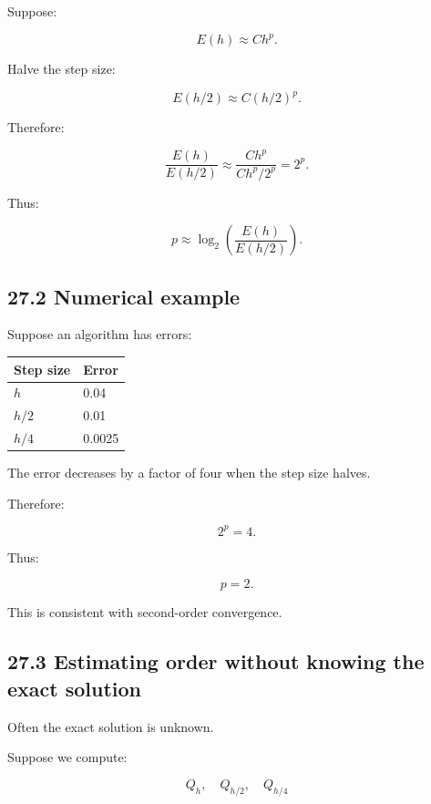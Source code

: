 Suppose:

\[ E(h)\approx Ch^p. \]

Halve the step size:

\[ E(h/2)\approx C(h/2)^p. \]

Therefore:

\[ \frac{E(h)}{E(h/2)} \approx \frac{Ch^p}{Ch^p/2^p} =2^p. \]

Thus:

\[ \boxed{ p\approx \log_2\left( \frac{E(h)}{E(h/2)} \right) }. \]

\subsection{27.2 Numerical example}\label{02-foundations-ii-ch029-numerical-example}

\hypertarget{02-foundations-ii-ch029-numerical-example}{}

Suppose an algorithm has errors:

{\def\LTcaptype{none} %
\begin{longtable}[]{@{}ll@{}}
\toprule\noalign{}
Step size & Error \\
\midrule\noalign{}
\endhead
\bottomrule\noalign{}
\endlastfoot
\(h\) & 0.04 \\
\(h/2\) & 0.01 \\
\(h/4\) & 0.0025 \\
\end{longtable}
}

The error decreases by a factor of four when the step size halves.

Therefore:

\[ 2^p=4. \]

Thus:

\[ \boxed{p=2}. \]

This is consistent with second-order convergence.

\subsection{27.3 Estimating order without knowing the exact solution}\label{02-foundations-ii-ch029-estimating-order-without-knowing-the-exact-solution}

\hypertarget{02-foundations-ii-ch029-estimating-order-without-knowing-the-exact-solution}{}

Often the exact solution is unknown.

Suppose we compute:

\[ Q_h,\quad Q_{h/2},\quad Q_{h/4} \]


